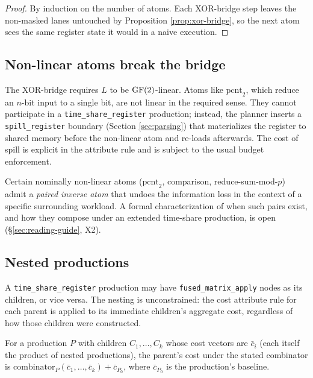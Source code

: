\begin{proof}
  By induction on the number of atoms. Each XOR-bridge
  step leaves the non-masked lanes untouched by
  Proposition \ref{prop:xor-bridge}, so the next
  atom sees the same register state it would in a
  naive execution.
\end{proof}

\subsection{Non-linear atoms break the bridge}

\begin{remark}
  The XOR-bridge requires $L$ to be $\operatorname{GF}(2)$-linear.
  Atoms like $\mathrm{pcnt}_2$, which reduce an
  $n$-bit input to a single bit, are not linear in
  the required sense. They cannot participate in a
  \texttt{time\_share\_register} production; instead,
  the planner inserts a \texttt{spill\_register}
  boundary (Section \ref{sec:parsing}) that
  materializes the register to shared memory before
  the non-linear atom and re-loads afterwards. The
  cost of spill is explicit in the attribute rule
  and is subject to the usual budget enforcement.
\end{remark}

\begin{conjecture}
  \label{conj:nonlinear}
  Certain nominally non-linear atoms ($\mathrm{pcnt}_2$,
  comparison, reduce-sum-mod-$p$) admit a
  \emph{paired inverse atom} that undoes the
  information loss in the context of a specific
  surrounding workload. A formal characterization
  of when such pairs exist, and how they compose
  under an extended time-share production, is open
  (\S\ref{sec:reading-guide}, X2).
\end{conjecture}

\subsection{Nested productions}

A \texttt{time\_share\_register} production may have
\texttt{fused\_matrix\_apply} nodes as its children, or
vice versa. The nesting is unconstrained: the cost
attribute rule for each parent is applied to its
immediate children's aggregate cost, regardless of
how those children were constructed.

\begin{proposition}
  \label{prop:nest-cost}
  For a production $P$ with children $C_1, \ldots,
  C_k$ whose cost vectors are $\bar{c}_i$ (each itself
  the product of nested productions), the parent's
  cost under the stated combinator is
  $\mathrm{combinator}_P(\bar{c}_1, \ldots,
  \bar{c}_k) + \bar{c}_{P_0}$, where $\bar{c}_{P_0}$
  is the production's baseline.
\end{proposition}

